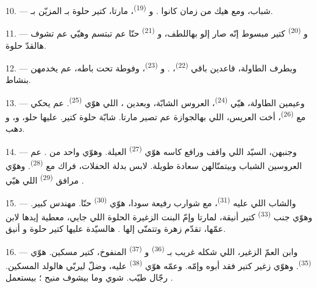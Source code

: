 10. ---  شباب، ومع هيك من زمان كانوا
. و \textsuperscript{(19)}، مارتا، كتير
حلوة بـ المزيّن بـ.

11. --- و \textsuperscript{(20)} كتير مبسوط إنّه صار إلو
 بهاللطف، و \textsuperscript{(21)} حنّا عم تبتسم
وهيّي عم تشوف  هالقدّ حلوة.

12. --- وبطرف الطاولة، قاعدين باقي 
\textsuperscript{(22)}، .
و \textsuperscript{(23)}، وفوطة تحت باطه، عم يخدمهن
بنشاط.

\VUsaut{3.0mm}

13. --- وعيمين الطاولة، هيّي  \textsuperscript{(24)}،
 العروس الشابّة، وبعدين ، اللي هوّي
 \textsuperscript{(25)}. عم يحكي مع 
\textsuperscript{(26)}، أخت العريس، اللي بهالجوازة عم تصير
 مارتا. شابّة حلوة كتير. عليها  حلو،
و، و دهب.

14. --- وجنبهن، السيّد اللي واقف ورافع كاسه هوّي 
\textsuperscript{(27)} العيلة. وهوّي واحد من . عم
  العروسين الشباب وبيتمنّالهن سعادة
طويلة. لابس بدلة الحفلات، فراك مع 
\textsuperscript{(28)}. وهوّي مرافق  \textsuperscript{(29)}
اللي هيّي .

15. --- والشاب اللي عليه  \textsuperscript{(31)}، مع شوارب
رفيعة سودا، هوّي  \textsuperscript{(30)} حنّا. مهندس
كبير. وهوّي جنب  \textsuperscript{(33)} كتير أنيقة،
 لمارتا وإمّ البنت الزغيرة الحلوة اللي جايي،
معطية إيدها لابن عمّها، تقدّم زهرة وتتمنّى إلها .
هالسيّدة عليها  كتير حلوة و أنيق.

16. --- وابن العمّ الزغير، اللي شكله غريب بـ
\textsuperscript{(36)} و \textsuperscript{(37)} المنفوخ،
كتير مسكين. هوّي  \textsuperscript{(35)}. وهوّي زغير كتير
فقد أبوه وإمّه. وعمّه هوّي  \textsuperscript{(38)} عليه،
وضلّ  ليربّي هالولد المسكين. رجّال طيّب. شوي
 وما بيشوف منيح ؛ بيستعمل .

